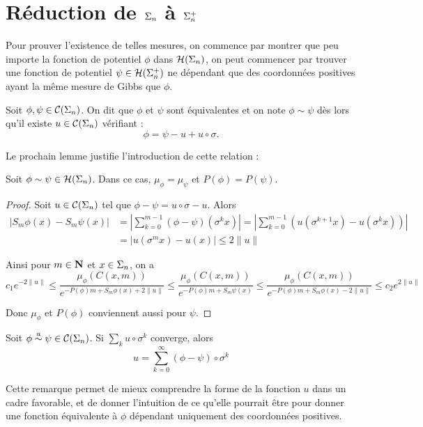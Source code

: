 \section{Réduction de $\s_n$ à $\sp_n$}

  Pour prouver l'existence de telles mesures, on commence par montrer que peu importe la fonction de potentiel $\phi$ dans $\Hs{n}$,
  on peut commencer par trouver une fonction de potentiel $\psi \in \Hsp{n}$
  ne dépendant que des coordonnées positives ayant la même mesure de Gibbs que $\phi$.

  \begin{definition}
    \label{def:fn_equiv}
    Soit $\phi, \psi \in \Cs{n}$. On dit que $\phi$ et $\psi$ sont équivalentes et on note $\phi \sim \psi$ dès lors
    qu'il existe $u \in \Cs{n}$ vérifiant :
    $$\phi = \psi - u + u \circ \sigma.$$
  \end{definition}

  Le prochain lemme justifie l'introduction de cette relation :

  \begin{lemma}
    \label{lem:fn_equiv_imp_gibbs_eq}
    Soit $\phi \sim \psi \in \Hs{n}$. Dans ce cas, $\mu_{\phi} = \mu_{\psi}$ et $P(\phi) = P(\psi)$.
  \end{lemma}

  \begin{proof}
    Soit $u \in \Cs{n}$ tel que $\phi - \psi = u\circ \sigma - u$. Alors
    \begin{align*}\left|S_m\phi(x) - S_m\psi(x)\right| &= \left|\sum_{k=0}^{m-1}(\phi - \psi)(\sigma^k x)\right|
							= \left|\sum_{k=0}^{m-1}(u(\sigma^{k+1}x) - u(\sigma^k x))\right| \\
						       &= \left|u(\sigma^m x) - u(x)\right| \leq 2 \lVert u \rVert
    \end{align*}

    Ainsi pour $m \in \N$ et $x \in \s_n$, on a
    $$c_1 e^{-2\lVert u\rVert} \leq \frac{\mu_{\phi}(C(x, m))}{e^{-P(\phi)m + S_m\phi(x) + 2\lVert u\rVert}}
			       \leq \frac{\mu_{\phi} (C(x, m))}{e^{-P(\phi)m + S_m\psi(x)}}
			       \leq \frac{\mu_{\phi}(C(x, m))}{e^{-P(\phi)m + S_m\phi(x) - 2\lVert u\rVert}} \leq c_2 e^{2\lVert u\rVert}$$

    Donc $\mu_{\phi}$ et $P(\phi)$ conviennent aussi pour $\psi$.
  \end{proof}

  \begin{remark}
    \label{rm:eq_if_equiv}
    Soit $\phi \overset{u}{\sim} \psi \in \Cs{n}$. Si $\sum_k{u\circ\sigma^k}$ converge,
    alors
    $$u = \sum_{k=0}^{\infty}{(\phi - \psi) \circ \sigma^k}$$

    Cette remarque permet de mieux comprendre la forme de la fonction $u$ dans un cadre favorable,
    et de donner l'intuition de ce qu'elle pourrait être pour donner une fonction équivalente à $\phi$ dépendant uniquement des coordonnées positives.
  \end{remark}

